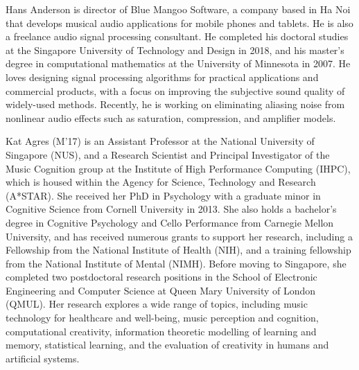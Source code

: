\documentclass{ieeeaccess}
\begin{document}
\begin{IEEEbiography}{Hans Anderson} is director of Blue Mangoo Software, a company based in Ha Noi that develops musical audio applications for mobile phones and tablets. He is also a freelance audio signal processing consultant. He completed his doctoral studies at the Singapore University of Technology and Design in 2018, and his master's degree in computational mathematics at the University of Minnesota in 2007. He loves designing signal processing algorithms for practical applications and commercial products, with a focus on improving the subjective sound quality of widely-used methods. Recently, he is working on eliminating aliasing noise from nonlinear audio effects such as saturation, compression, and amplifier models.
\end{IEEEbiography}

\begin{IEEEbiography}{Kat Agres} (M'17) is an Assistant Professor at the National University of Singapore (NUS), and a Research Scientist and Principal Investigator of the Music Cognition group at the Institute of High Performance Computing (IHPC), which is housed within the Agency for Science, Technology and Research (A*STAR). She received her PhD in Psychology with a graduate minor in Cognitive Science from Cornell University in 2013. She also holds a bachelor's degree in Cognitive Psychology and Cello Performance from Carnegie Mellon University, and has received numerous grants to support her research, including a Fellowship from the National Institute of Health (NIH), and a training fellowship from the National Institute of Mental (NIMH). Before moving to Singapore, she completed two postdoctoral research positions in the School of Electronic Engineering and Computer Science at Queen Mary University of London (QMUL). Her research explores a wide range of topics, including music technology for healthcare and well-being, music perception and cognition, computational creativity, information theoretic modelling of learning and memory, statistical learning, and the evaluation of creativity in humans and artificial systems.
\end{IEEEbiography}
\end{document}
